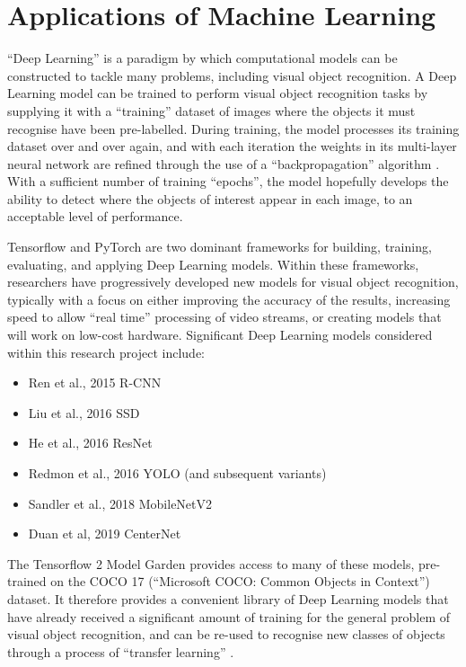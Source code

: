 \documentclass[11pt,twoside]{report}
\begin{document}
\section{Applications of Machine Learning}

``Deep Learning'' is a paradigm by which computational models can be constructed to tackle many problems, including visual object recognition.  A Deep Learning model can be trained to perform visual object recognition tasks by supplying it with a ``training'' dataset of images where the objects it must recognise have been pre-labelled.  During training, the model processes its training dataset over and over again, and with each iteration the weights in its multi-layer neural network are refined through the use of a ``backpropagation'' algorithm \cite{deeplearning}.  With a sufficient number of training ``epochs'', the model hopefully develops the ability to detect where the objects of interest appear in each image, to an acceptable level of performance.

Tensorflow \cite{TENSORFLOW2016A} \cite{TENSORFLOW2016B} and PyTorch \cite{pytorch} are two dominant frameworks for building, training, evaluating, and applying Deep Learning models.  Within these frameworks, researchers have progressively developed new models for visual object recognition, typically with a focus on either improving the accuracy of the results, increasing speed to allow ``real time'' processing of video streams, or creating models that will work on low-cost hardware.  Significant Deep Learning models considered within this research project include:

\begin{itemize}
\item{Ren et al., 2015 \cite{REN2016} R-CNN}
\item{Liu et al., 2016 \cite{ssd} SSD}
\item{He et al., 2016 \cite{He_2016_CVPR} ResNet}
\item{Redmon et al., 2016 \cite{YOLOv1} YOLO (and subsequent variants)}
\item{Sandler et al., 2018 \cite{MobileNetV2} MobileNetV2}
\item{Duan et al, 2019 \cite{centernet} CenterNet}
\end{itemize}

The Tensorflow 2 Model Garden \cite{zoo} provides access to many of these models, pre-trained on the COCO 17 (``Microsoft COCO: Common Objects in Context'') dataset.  It therefore provides a convenient library of Deep Learning models that have already received a significant amount of training for the general problem of visual object recognition, and can be re-used to recognise new classes of objects through a process of ``transfer learning'' \cite{coco} \cite{transferlearning}.
\end{document}
